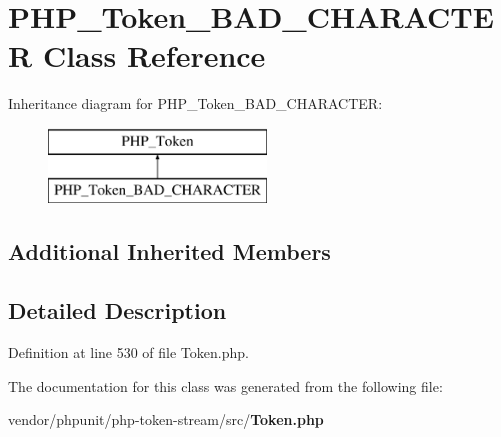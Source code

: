 \section{P\+H\+P\+\_\+\+Token\+\_\+\+B\+A\+D\+\_\+\+C\+H\+A\+R\+A\+C\+T\+E\+R Class Reference}
\label{class_p_h_p___token___b_a_d___c_h_a_r_a_c_t_e_r}
Inheritance diagram for P\+H\+P\+\_\+\+Token\+\_\+\+B\+A\+D\+\_\+\+C\+H\+A\+R\+A\+C\+T\+E\+R\+:\begin{figure}[H]
\begin{center}
\leavevmode
\includegraphics[height=2.000000cm]{class_p_h_p___token___b_a_d___c_h_a_r_a_c_t_e_r}
\end{center}
\end{figure}
\subsection*{Additional Inherited Members}


\subsection{Detailed Description}


Definition at line 530 of file Token.\+php.



The documentation for this class was generated from the following file\+:\begin{DoxyCompactItemize}
\item 
vendor/phpunit/php-\/token-\/stream/src/{\bf Token.\+php}\end{DoxyCompactItemize}
